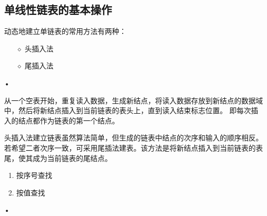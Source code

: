 \begin{frame}[fragile]
  
\end{frame}

\begin{frame}[fragile]
 
\end{frame}


\begin{frame}[fragile]
  
\end{frame}

\subsection{单线性链表的基本操作}

\begin{frame}
动态地建立单链表的常用方法有两种：
\begin{itemize}
\item[$\diamond$]
头插入法
\item[$\diamond$]
尾插入法
\end{itemize}•
\end{frame}

\begin{frame}
 从一个空表开始，重复读入数据，生成新结点，将读入数据存放到新结点的数据域中，然后将新结点插入到当前链表的表头上，直到读入结束标志位置。
即每次插入的结点都作为链表的第一个结点。
\end{frame}

\begin{frame}[fragile]
 
\end{frame}

\begin{frame}
 头插入法建立链表虽然算法简单，但生成的链表中结点的次序和输入的顺序相反。若希望二者次序一致，可采用尾插法建表。该方法是将新结点插入到当前链表的表尾，使其成为当前链表的尾结点。
\end{frame}

\begin{frame}[fragile]
 
\end{frame}

\begin{frame}
\begin{enumerate}
\item 按序号查找
\item 按值查找
\end{enumerate}•
\end{frame}

